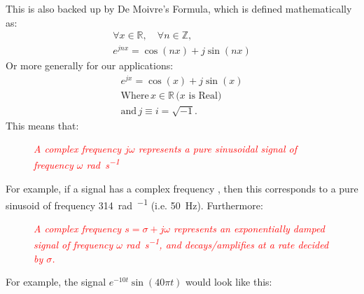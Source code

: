 \documentclass[12pt]{report}
\begin{document}
\noindent This is also backed up by De Moivre's Formula, which is defined mathematically as:
\begin{gather*}
    \forall x \in \mathbb{R}, \quad \forall n \in \mathbb{Z}, \\
    e^{j n x} = \cos(n x) + j \sin(n x)
\end{gather*}
Or more generally for our applications:
\begin{gather*}
    e^{jx} = \cos(x) + j\sin(x) \\
    \text{Where} \, x \in \mathbb{R}\, \text{(\(x\) is Real)} \\
    \text{and} \, j \equiv i = \sqrt{-1}.
\end{gather*}
\newpage
\noindent This means that:
\begin{figure}[H]
    \centering
    \begin{mdframed}
        \begin{center}
            \textcolor{red}{\emph{A complex frequency \(j\omega \) represents a pure sinusoidal signal of frequency \(\omega \) \unit{\radian\per\second}}}
        \end{center}
    \end{mdframed}\label{fig:complex-sinusoid-def-1}
\end{figure}
\noindent For example, if a signal has a complex frequency  , then this corresponds to a pure sinusoid of frequency \SI{314}{\radian\per\sec} (i.e. \SI{50}{\hertz}). Furthermore:
\begin{figure}[H]
    \centering
    \begin{mdframed}
        \begin{center}
            \textcolor{red}{%
                \emph{A complex frequency \(s = \sigma + j\omega \) represents an exponentially
                    damped signal of frequency \(\omega \) \unit{\radian\per\second}, and decays/amplifies at a rate decided by \(\sigma \).}}
        \end{center}
    \end{mdframed}\label{fig:exp-damped-sinusoid-def-1}
\end{figure}
\noindent For example, the signal \( e^{- 10t}\sin(40\pi t) \) would look like this:
\end{document}
